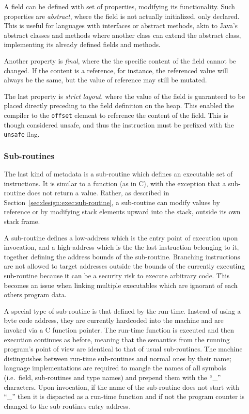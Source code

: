 A field can be defined with set of properties, modifying its functionality. Such
properties are {\em abstract}, where the field is not actually initialized, only
declared. This is useful for languages with interfaces or abstract methods, akin
to Java's abstract classes and methods where another class can extend the
abstract class, implementing its already defined fields and methods.

Another property is {\em final}, where the the specific content of the field
cannot be changed. If the content is a reference, for instance, the referenced
value will always be the same, but the value of reference may still be mutated.

The last property is {\em strict layout}, where the value of the field is
guaranteed to be placed directly preceding to the field definition on the
heap. This enabled the compiler to the {\tt offset} element to reference the
content of the field. This is though considered unsafe, and thus the instruction
must be prefixed with the {\tt unsafe} flag.

\subsubsection{Sub-routines}
\label{sec:implementation:meta:sub-routines}

The last kind of metadata is a sub-routine which defines an executable set of
instructions. It is similar to a function (as in C), with the exception that a
sub-routine does not return a value. Rather, as described in
Section~\ref{sec:design:exec:sub-routine}, a sub-routine can modify values by
reference or by modifying stack elements upward into the stack, outside its own
stack frame.

A sub-routine defines a low-address which is the entry point of execution upon
invocation, and a high-address which is the the last instruction belonging to
it, together defining the address bounds of the sub-routine. Branching
instructions are not allowed to target addresses outside the bounds of the
currently executing sub-routine because it can be a security risk to execute
arbitrary code. This becomes an issue when linking multiple executables which
are ignorant of each others program data.

A special type of sub-routine is that defined by the run-time. Instead of using
a byte code address, they are currently hardcoded into the machine and are
invoked via a C function pointer. The run-time function is executed and then
execution continues as before, meaning that the semantics from the running
program's point of view are identical to that of usual sub-routines. The machine
distinguishes between run-time sub-routines and normal ones by their name;
language implementations are required to mangle the names of all symbols
(i.e.~field, sub-routines and type names) and prepend them with the ``\_''
characters. Upon invocation, if the name of the sub-routine does not start with
``\_'' then it is dispacted as a run-time function and if not the program
counter is changed to the sub-routines entry address.

